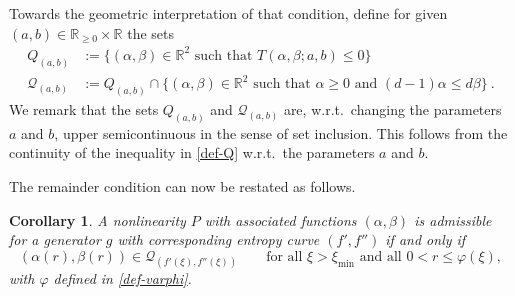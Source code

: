 \documentclass[reqno]{amsart}
\newtheorem{corollary}[lemma]{Corollary}
\newcommand{\R}{\mathbb{R}}
\newcommand{\Rnn}{\mathbb{R}_{\ge0}}
\newcommand{\ximin}{\xi_{\text{min}}}
\begin{document}
Towards the geometric interpretation of that condition, define for given $(a,b)\in\Rnn\times\R$ the sets
\begin{align}
    \label{def-Q}
    Q_{(a,b)}&:=\{(\alpha,\beta)\in \R^2 \text{ such that } T(\alpha,\beta;a,b)\leq 0\} \\
    \nonumber
    \mathcal{Q}_{(a,b)} &:= Q_{(a,b)} \cap \{(\alpha,\beta)\in\R^2 \text{ such that } \alpha\ge0 \text{ and } (d-1)\alpha\le d\beta \}\ .
\end{align}
We remark that the sets $Q_{(a,b)}$ and $\mathcal{Q}_{(a,b)}$ are, w.r.t.\ changing the parameters $a$ and $b$, upper semicontinuous in the sense of set inclusion. This follows from the continuity of the inequality in \eqref{def-Q} w.r.t.\ the parameters $a$ and $b$.

%
The remainder condition can now be restated as follows.
%
\begin{corollary}\label{corentgen}
    A nonlinearity $P$ with associated functions $(\alpha,\beta)$ is admissible for a generator $g$ with corresponding entropy curve $(f',f'')$ if and only if 
    \begin{equation}\label{qg}
        (\alpha(r),\beta(r))\in\mathcal{Q}_{(f'(\xi),f''(\xi))} \qquad \text{for all $\xi>\ximin$ and all $0<r\le\varphi(\xi)$},
    \end{equation}
    with $\varphi$ defined in \eqref{def-varphi}.
\end{corollary}
%
\end{document}
